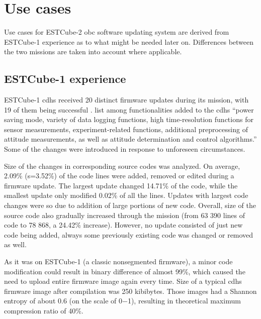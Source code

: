 \newpage
\section{Use cases}
\label{s:usecases}

 Use cases for ESTCube-2 \gls{obc} software updating system are derived from ESTCube-1 experience as to what might be needed later on. Differences between the two missions are taken into account where applicable.

\subsection{ESTCube-1 experience}

ESTCube-1 \gls{cdhs} received 20 distinct firmware updates during its mission, with 19 of them being successful \cite{Suenter2016}. \textcite{Slavinskis2015} list among functionalities added to the \gls{cdhs} ``power saving mode, variety of data logging functions, high time-resolution functions for sensor measurements, experiment-related functions, additional preprocessing of attitude measurements, as well as attitude determination and control algorithms.'' Some of the changes were introduced in response to unforeseen circumstances.

Size of the changes in corresponding source codes was analyzed. On average, 2.09\% (s=3.52\%) of the code lines were added, removed or edited during a firmware update. The largest update changed 14.71\% of the code, while the smallest update only modified 0.02\% of all the lines. Updates with largest code changes were so due to addition of large portions of new code. Overall, size of the source code also gradually increased through the mission (from 63 390 lines of code to 78 868, a 24.42\% increase). However, no update consisted of just new code being added, always some previously existing code was changed or removed as well.

As it was on ESTCube-1 (a classic nonsegmented firmware), a minor code modification could result in binary difference of almost 99\%, which caused the need to upload entire firmware image again every time. Size of a typical \gls{cdhs} firmware image after compilation was 250 kibibytes. Those images had a Shannon entropy of about 0.6 (on the scale of 0$-$1), resulting in theoretical maximum compression ratio of 40\%. \cite{Suenter2016}

